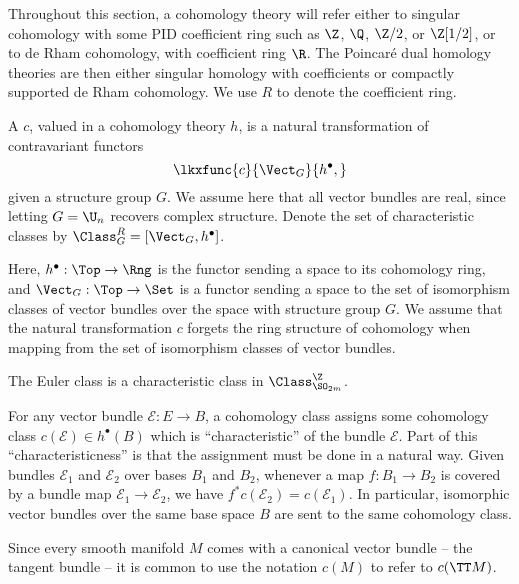 Throughout this section, a cohomology theory will refer either to singular cohomology with some PID coefficient ring such as $\Z$, $\Q$, $\Z/2$, or $\Z[1/2]$, or to de Rham cohomology, with coefficient ring $\R$. The Poincar\'e dual homology theories are then either singular homology with coefficients or compactly supported de Rham cohomology. We use $R$ to denote the coefficient ring.

\begin{definition}\label{defn:characteristic-class}
	A  $c$, valued in a cohomology theory $h$, is a natural transformation of contravariant functors
	\[
		\lkxfunc{c}{\Vect_G}{h^\bullet,}
	\]
	given a structure group $G$. We assume here that all vector bundles are real, since letting $G=\U_n$ recovers complex structure. Denote the set of characteristic classes by $\Class_G^R = [\Vect_G , h^\bullet]$.
\end{definition}

Here, $h^\bullet : \Top \to \Rng$ is the functor sending a space to its  cohomology ring, and $\Vect_G : \Top \to \Set$ is a functor sending a space to the set of isomorphism classes of vector bundles over the space with structure group $G$. We assume that the natural transformation $c$ forgets the ring structure of cohomology when mapping from the set of isomorphism classes of vector bundles.

\begin{example}
	The Euler class is a characteristic class in $\Class^\Z_{\SO_{2m}}$.
\end{example}

For any vector bundle $\mathcal{E} : E \to B$, a cohomology class assigns some cohomology class $c(\mathcal{E})\in h^\bullet(B)$ which is ``characteristic'' of the bundle $\mathcal{E}$.
Part of this ``characteristicness'' is that the assignment must be done in a natural way. Given bundles $\mathcal{E}_1$ and $\mathcal{E}_2$ over bases $B_1$ and $B_2$, whenever a map $f : B_1 \to B_2$ is covered by a bundle map $\mathcal{E}_1 \to \mathcal{E}_2$, we have $f^* c(\mathcal{E}_2) = c(\mathcal{E}_1)$. In particular, isomorphic vector bundles over the same base space $B$ are sent to the same cohomology class. 

\begin{convention*}
	Since every smooth manifold $M$ comes with a canonical vector bundle -- the tangent bundle -- it is common to use the notation $c(M)$ to refer to $c(\TT M)$.
\end{convention*}

